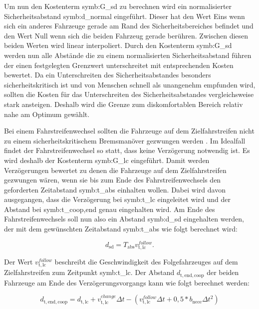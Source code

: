 Um nun den Kostenterm \gls{symb:G_sd} zu berechnen wird ein normalisierter Sicherheitsabstand \gls{symb:d_normal} eingef\"uhrt.
Dieser hat den Wert Eins wenn sich ein anderes Fahrzeuge gerade am Rand des Sicherheitsbereiches befindet und den Wert Null wenn sich die beiden Fahrzeug gerade ber\"uhren.
Zwischen diesen beiden Werten wird linear interpoliert.
Durch den Kostenterm \gls{symb:G_sd} werden nun alle Abst\"ande die zu einem normalisierten Sicherheitsabstand f\"uhren der einen festgelegten Grenzwert unterschreitet mit entsprechenden Kosten bewertet.
Da ein Unterschreiten des Sicherheitsabstandes besonders sicherheitskritisch ist und von Menschen schnell als unangenehm empfunden wird, sollten die Kosten f\"ur das Unterschreiten des Sicherheitsabstandes vergleichsweise stark ansteigen.
Deshalb wird die Grenze zum diskomfortablen Bereich relativ nahe am Optimum gew\"ahlt.

Bei einem Fahrstreifenwechsel sollten die Fahrzeuge auf dem Zielfahrstreifen nicht zu einem sicherheitskritischem Bremsman\"over gezwungen werden \cite{Treiber2010}.
Im Idealfall findet der Fahrstreifenwechsel so statt, dass keine Verz\"ogerung notwendig ist.
Es wird deshalb der Kostenterm \gls{symb:G_lc} eingef\"uhrt. 
Damit werden Verz\"ogerungen bewertet zu denen die Fahrzeuge auf dem Zielfahrstreifen gezwungen w\"aren, wenn sie bis zum Ende des Fahrstreifenwechsels den geforderten Zeitabstand  \gls{symb:t_abs} einhalten wollen.
Dabei wird davon ausgegangen, dass die Verz\"ogerung bei \gls{symb:t_lc} eingeleitet wird und der Abstand bei \gls{symb:t_coop,end} genau eingehalten wird.
Am Ende des Fahrstreifenwechsels soll nun also ein Abstand \gls{symb:d_sd} eingehalten werden, der mit dem gew\"unschten Zeitabstand \gls{symb:t_abs} wie folgt berechnet wird:

\begin{equation}
	d_\mathrm{sd} =  T_\mathrm{abs}  v_\mathrm{t,lc}^{follow}.
\end{equation}

Der Wert \(v_\mathrm{t,lc}^{follow}\) beschreibt die Geschwindigkeit des Folgefahrzeuges auf dem Zielfahrstreifen zum Zeitpunkt \gls{symb:t_lc}.
Der Abstand \( d_\mathrm{t,end,coop}\) der beiden Fahrzeuge am Ende des Verz\"ogerungsvorgangs kann wie folgt berechnet werden:

\begin{equation}
	d_\mathrm{t,end,coop} = d_\mathrm{t,lc} + v_\mathrm{t,lc}^{change} \Delta t- \left( v_\mathrm{t,lc}^{follow} \Delta t+ 0,5 * b_\mathrm{nece} \Delta t^2 \right)
\end{equation}

